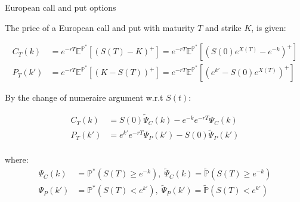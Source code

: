 \documentclass{beamer}
\begin{document}
\begin{frame}{European call and put options}

    {\footnotesize \footnotesize
    \par The price of a European call and put with maturity \( T \) and strike \( K \), is given:
    
    \begin{align*}
        C_T(k) &= e^{-rT} \mathbb{E}^{\mathbb{P}^*} [(S(T) - K)^+] = e^{-rT} \mathbb{E}^{\mathbb{P}^*} \left[ (S(0)e^{X(T)} - e^{-k})^+ \right]\\
        P_T(k')& = e^{-rT} \mathbb{E}^{\mathbb{P}^*} [(K - S(T))^+] = e^{-rT} \mathbb{E}^{\mathbb{P}^*} \left[ (e^{k'} - S(0)e^{X(T)})^+ \right]
    \end{align*}
    
    \par  \pause By the change of numeraire argument w.r.t $S(t)$:
    
    \begin{align*}
       C_T(k) &= S(0) \tilde{\Psi}_C(k) - e^{-k} e^{-rT} \Psi_C(k)\\
        P_T(k') &= e^{k'} e^{-rT} \Psi_P(k') - S(0) \tilde{\Psi}_P(k')\\
    \end{align*}
    
    \vspace{-2em}
    \par where: 
    \begin{align*}
      \Psi_C(k) &= \mathbb{P}^*(S(T) \geq e^{-k}),\;\tilde{\Psi}_C(k) = \tilde{\mathbb{P}}(S(T) \geq e^{-k})\\
      \Psi_P(k') &= \mathbb{P}^*(S(T) < e^{k'}), \; \tilde{\Psi}_P(k') = \tilde{\mathbb{P}}(S(T) < e^{k'})
    \end{align*}
    }
    
\end{frame}
\end{document}
